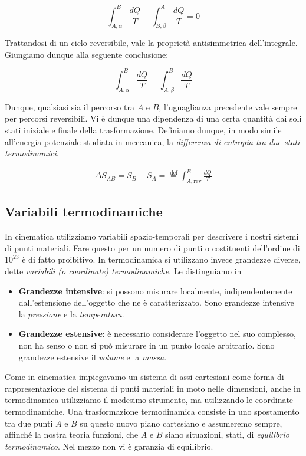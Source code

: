 \[ \int_{A,\alpha}^{B} \frac{dQ}{T} + \int_{B,\beta}^{A} \frac{dQ}{T} = 0 \]

\noindent Trattandosi di un ciclo reversibile, vale la proprietà antisimmetrica
dell'integrale. Giungiamo dunque alla seguente conclusione:

\[ \int_{A,\alpha}^{B} \frac{dQ}{T} = \int_{A,\beta}^{B} \frac{dQ}{T} \]

\noindent Dunque, qualsiasi sia il percorso tra $A$ e $B$, l'uguaglianza
precedente vale sempre per percorsi reversibili. Vi è dunque una dipendenza
di una certa quantità dai soli stati iniziale e finale della trasformazione.
Definiamo dunque, in modo simile all'energia potenziale studiata in meccanica,
la \textit{differenza di entropia tra due stati termodinamici}.

\begin{align}
    \Delta S_{AB} = S_B - S_A = \stackrel{\text{def}}{=} \int_{A,\text{rev}}^{B} \frac{dQ}{T}
\end{align}


\subsection*{Variabili termodinamiche}
In cinematica utilizziamo variabili spazio-temporali per descrivere i nostri
sistemi di punti materiali. Fare questo per un numero di punti o costituenti
dell'ordine di $10^{23}$ è di fatto proibitivo. In termodinamica si utilizzano
invece grandezze diverse, dette \textit{variabili (o coordinate) termodinamiche}.
Le distinguiamo in

\begin{itemize}
    \item \textbf{Grandezze intensive}: si possono misurare localmente,
    indipendentemente dall'estensione dell'oggetto che ne è caratterizzato.
    Sono grandezze intensive la \textit{pressione} e la \textit{temperatura}.

    \item \textbf{Grandezze estensive}: è necessario considerare l'oggetto nel
    suo complesso, non ha senso o non si può misurare in un punto locale arbitrario.
    Sono grandezze estensive il \textit{volume} e la \textit{massa}.
\end{itemize}

\noindent Come in cinematica impiegavamo un sistema di assi cartesiani come
forma di rappresentazione del sistema di punti materiali in moto nelle dimensioni,
anche in termodinamica utilizziamo il medesimo strumento, ma utilizzando le
coordinate termodinamiche. Una trasformazione termodinamica consiste in uno
spostamento tra due punti $A$ e $B$ su questo nuovo piano cartesiano e assumeremo
sempre, affinché la nostra teoria funzioni, che $A$ e $B$ siano situazioni, stati, di
\textit{equilibrio termodinamico}. Nel mezzo non vi è garanzia di equilibrio.

